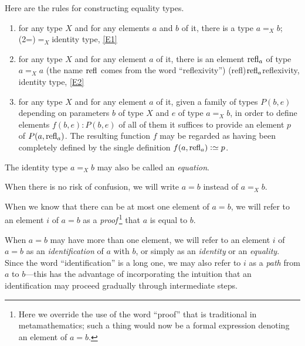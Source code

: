 Here are the rules for constructing equality types.
\begin{enumerate}[label=(E\arabic*),ref=(E\arabic*)]
\item\label{E1}
  for any type $X$ and for any elements $a$ and $b$ of it, there is a type $a =_X b$;%
  \glossary(2=){${=_X}$}{identity type, \cref{E1}}%
\item\label{E2} for any type $X$ and for any element $a$ of it, there is an element $\mathrm{refl}_{a}$ of type $a =_X a$
  (the name $\mathrm{refl}_{}$ comes from the word ``reflexivity'')%
  \glossary(refl){$\protect\mathrm{refl}_{a}$}{reflexivity, identity type, \cref{E2}}
\item\label{E3} for any type $X$ and for any element $a$ of it, given a family of types $P(b,e)$ depending on parameters $b$ of type $X$ and $e$ of type
  $a =_X b$, in order to define elements $f(b,e) : P(b,e)$ of all of them it suffices to provide an element $p$ of $P(a,\mathrm{refl}_{a})$.  The resulting
  function $f$ may be regarded as having been completely defined by the single definition $f(a,\refl a) \defeq p$.
\end{enumerate}

The identity type $a =_X b$ may also be called an \emph{equation}.%

When there is no risk of confusion, we will write $a=b$ instead of $a =_X b$.

When we know that there can be at most one element of $a=b$, we will refer to an element $i$ of $a=b$ as a \emph{proof}\,\footnote{Here we override
  the use of the word ``proof'' that is traditional in metamathematics; such a thing would now be a formal expression denoting an
  element of $a=b$.} that $a$ is equal to $b$.%

When $a=b$ may have more than one element, we will refer to an element $i$ of $a=b$ as an \emph{identification} of $a$ with $b$, or simply as an
\emph{identity} or an \emph{equality}.  Since the word ``identification'' is a long one, we may also refer to $i$ as a \emph{path} from $a$ to
$b$---this has the advantage of incorporating the intuition that an identification may proceed gradually through intermediate steps.%
%

